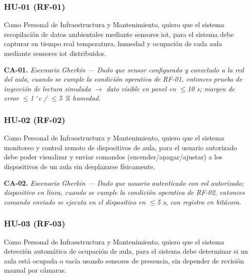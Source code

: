 \subsubsection*{HU-01 (RF-01)}


Como Personal de Infraestructura y Mantenimiento, quiero que el sistema recopilación de datos ambientales mediante sensores iot, para el sistema debe capturar en tiempo real temperatura, humedad y ocupación de cada aula mediante sensores iot distribuidos.


\textbf{CA-01.} \textit{Escenario }\textit{Gherkin}\textit{ --- Dado que sensor configurado y conectado a la red del aula, cuando se cumple la condición operativa de RF-01, entonces prueba de inyección de lectura simulada $\rightarrow$ dato visible en panel en $\leq$10 s; margen de error $\leq$1 }\textit{$^{\circ}$c}\textit{ / $\leq$5 \% humedad.}


\subsubsection*{HU-02 (RF-02)}


Como Personal de Infraestructura y Mantenimiento, quiero que el sistema monitoreo y control remoto de dispositivos de aula, para el usuario autorizado debe poder visualizar y enviar comandos (encender/apagar/ajustar) a los dispositivos de un aula sin desplazarse físicamente.


\textbf{CA-02.} \textit{Escenario }\textit{Gherkin}\textit{ --- Dado que usuario autenticado con rol autorizado; dispositivo en línea, cuando se cumple la condición operativa de RF-02, entonces comando enviado se ejecuta en el dispositivo en $\leq$5 s, con registro en bitácora.}


\subsubsection*{HU-03 (RF-03)}


Como Personal de Infraestructura y Mantenimiento, quiero que el sistema detección automática de ocupación de aula, para el sistema debe determinar si un aula está ocupada o vacía usando sensores de presencia, sin depender de revisión manual por cámaras.


